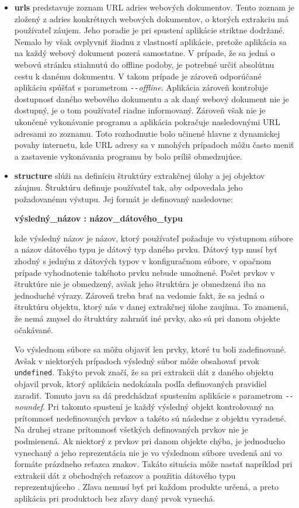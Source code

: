 \begin{itemize}
  \item \textbf{urls} predstavuje zoznam URL adries webových dokumentov. Tento zoznam je zložený z adries konkrétnych webových dokumentov, o ktorých extrakciu má používateľ záujem. Jeho poradie je pri spustení aplikácie striktne dodržané. Nemalo by však ovplyvniť žiadnu z vlastností aplikácie, pretože aplikácia sa na každý webový dokument pozerá samostatne. V prípade, že sa jedná o webovú stránku stiahnutú do offline podoby, je potrebné určiť absolútnu cestu k danému dokumentu. V takom prípade je zároveň odporúčané aplikáciu spúšťať s parametrom \textit{\texttt{-{}-}offline}. Aplikácia zároveň kontroluje dostupnosť daného webového dokumentu a ak daný webový dokument nie je dostupný, je o tom používateľ riadne informovaný. Zároveň však nie je ukončené vykonávanie programu a aplikácia pokračuje nasledovnými URL adresami zo zoznamu. Toto rozhodnutie bolo učinené hlavne z dynamickej povahy internetu, kde URL adresy sa v mnohých prípadoch môžu často meniť a zastavenie vykonávania programu by bolo príliš obmedzujúce. 
  
  \item \textbf{structure} slúži na definíciu štruktúry extrakčnej úlohy a jej objektov záujmu. Štruktúru definuje používateľ tak, aby odpovedala jeho požadovanému výstupu. Jej formát je definovaný nasledovne:
  
  \textbf{výsledný\_názov : názov\_dátového\_typu}
  
  kde výsledný názov je názov, ktorý používateľ požaduje vo výstupnom súbore a názov dátového typu je  dátový typ daného prvku. Dátový typ musí byť zhodný s jedným z dátových typov v konfiguračnom súbore, v opačnom prípade vyhodnotenie takéhoto prvku nebude umožnené. Počet prvkov v štruktúre nie je obmedzený, avšak jeho štruktúra je obmedzená iba na jednoduché výrazy. Zároveň treba brať na vedomie fakt, že sa jedná o štruktúru objektu, ktorý nás v danej extrakčnej úlohe zaujíma. To znamená, že nemá zmysel do štruktúry zahrnúť iné prvky, ako sú pri danom objekte očakávané.
  
  Vo výslednom súbore sa môžu objaviť len prvky, ktoré tu boli zadefinované. Avšak v niektorých prípadoch výsledný súbor môže obsahovať prvok \texttt{undefined}. Takýto prvok značí, že sa pri extrakcii dát z daného objektu objavil prvok, ktorý aplikácia nedokázala podľa definovaných pravidiel zaradiť. Tomuto javu sa dá predchádzať spustením aplikácie s parametrom \textit{\texttt{-{}-}noundef}. Pri takomto spustení je každý výsledný objekt kontrolovaný na prítomnosť nedefinovaných prvkov a takéto sú následne z objektu vyradené. Na druhej strane prítomnosť všetkých definovaných prvkov nie je podmienená. Ak niektorý z prvkov pri danom objekte chýba, je jednoducho vynechaný a jeho reprezentácia nie je vo výslednom súbore uvedená ani vo formáte prázdneho reťazca znakov. Takáto situácia môže nastať napríklad pri extrakcii dát z obchodných reťazcov a použitia dátového typu reprezentujúceho . Zľava nemusí byť pri každom produkte určená, a preto aplikácia pri produktoch bez zľavy daný prvok vynechá.
  

\end{itemize}
